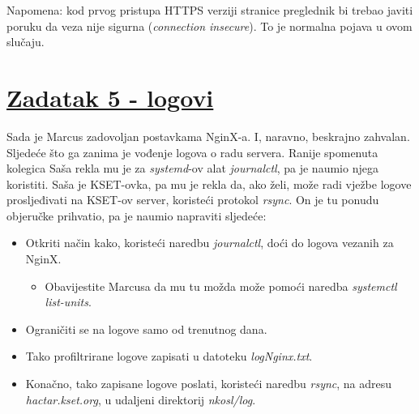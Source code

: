 \documentclass[12pt,a4paper]{article}
\begin{document}
		Napomena: kod prvog pristupa HTTPS verziji stranice preglednik bi trebao javiti poruku da veza nije sigurna (\textit{connection insecure}). To je normalna pojava u ovom slučaju.


	\newpage

	\section*{\underline{Zadatak 5 - logovi}}
		
		Sada je Marcus zadovoljan postavkama NginX-a. I, naravno, beskrajno zahvalan. Sljedeće što ga zanima je vođenje logova o radu servera. Ranije spomenuta kolegica Saša rekla mu je za \textit{systemd}-ov alat \textit{journalctl}, pa je naumio njega koristiti. Saša je KSET-ovka, pa mu je rekla da, ako želi, može radi vježbe logove prosljeđivati na KSET-ov server, koristeći protokol \textit{rsync}. On je tu ponudu objeručke prihvatio, pa je naumio napraviti sljedeće:
		\begin{itemize}
			\item Otkriti način kako, koristeći naredbu \textit{journalctl}, doći do logova vezanih za NginX.
			\begin{itemize}
				\item Obavijestite Marcusa da mu tu možda može pomoći naredba \textit{systemctl list-units}.
			\end{itemize}
			\item Ograničiti se na logove samo od trenutnog dana.
			\item Tako profiltrirane logove zapisati u datoteku \textit{logNginx.txt}.
			\item Konačno, tako zapisane logove poslati, koristeći naredbu \textit{rsync}, na adresu \textit{hactar.kset.org}, u udaljeni direktorij \textit{nkosl/log}.
		\end{itemize}
		
	\newpage
\end{document}
